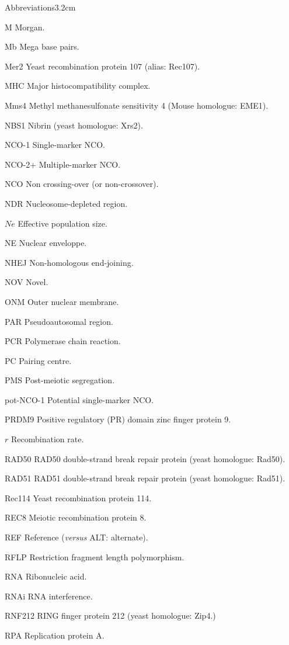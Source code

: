 \begin{mclistof}{Abbreviations}{3.2cm}
\item[M] Morgan.
\item[Mb] Mega base pairs.
\item[Mer2] Yeast recombination protein 107 (alias: Rec107).
\item[MHC] Major histocompatibility complex.
\item[Mms4] Methyl methanesulfonate sensitivity 4 (Mouse homologue: EME1).
\item[NBS1] Nibrin (yeast homologue: Xrs2).
\item[NCO-1] Single-marker NCO\@.
\item[NCO-2+] Multiple-marker NCO\@.
\item[NCO] Non crossing-over (or non-crossover).
\item[NDR] Nucleosome-depleted region.
\item[$Ne$] Effective population size.
\item[NE] Nuclear enveloppe.
\item[NHEJ] Non-homologous end-joining.
\item[NOV] Novel.
\item[ONM] Outer nuclear membrane.
\item[PAR] Pseudoautosomal region.
\item[PCR] Polymerase chain reaction.
\item[PC] Pairing centre.
\item[PMS] Post-meiotic segregation.
\item[pot-NCO-1] Potential single-marker NCO\@.
\item[PRDM9] Positive regulatory (PR) domain zinc finger protein 9.
\item[$r$] Recombination rate.
\item[RAD50] RAD50 double-strand break repair protein (yeast homologue: Rad50).
\item[RAD51] RAD51 double-strand break repair protein (yeast homologue: Rad51).
\item[Rec114] Yeast recombination protein 114.
\item[REC8] Meiotic recombination protein 8.
\item[REF] Reference (\textit{versus} ALT\@: alternate).
\item[RFLP] Restriction fragment length polymorphism.
\item[RNA] Ribonucleic acid.
\item[RNAi] RNA interference.
\item[RNF212] RING finger protein 212 (yeast homologue: Zip4.)
\item[RPA] Replication protein A\@.

\end{mclistof}
